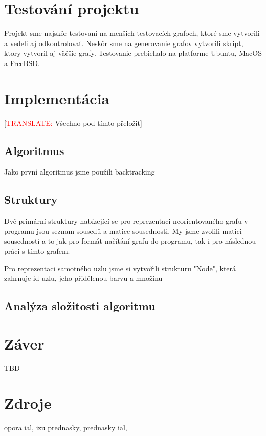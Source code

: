 \documentclass[a4paper,11pt]{article}
\begin{document}
\section{Testování projektu}
Projekt sme najskôr testovani na menšich testovacích grafoch, ktoré sme vytvorili a vedeli aj odkontrolovať. Neskôr sme na generovanie grafov vytvorili skript, ktory vytvoril aj väčšie grafy. Testovanie prebiehalo na platforme Ubuntu, MacOS a FreeBSD.

\section{Implementácia}
[\textcolor{red}{TRANSLATE: }Všechno pod tímto přeložit]

\subsection{Algoritmus}
Jako první algoritmus jsme použili backtracking 

\subsection{Struktury}
Dvě primární struktury nabízející se pro reprezentaci neorientovaného grafu v programu jsou seznam sousedů a matice sousednosti. My jsme zvolili matici sousednosti a to jak pro formát načítání grafu do programu, tak i pro následnou práci s tímto grafem.

Pro reprezentaci samotného uzlu jsme si vytvořili strukturu "Node", která zahrnuje id uzlu, jeho přidělenou barvu a množinu


\subsection{Analýza složitosti algoritmu}

\section{Záver}
TBD

\section{Zdroje}
opora ial,
izu prednasky,
prednasky ial, 
\end{document}
